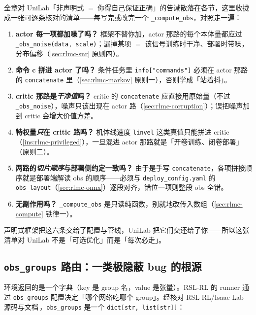 \begin{insight}\label{ins:rlmc-uniselfcheck}
全章对 UniLab「非声明式 $=$ 你得自己保证正确」的告诫散落在各节，这里收拢成一张可逐条核对的清单——每写完或改完一个 \verb|_compute_obs|，对照走一遍：
\begin{enumerate}
  \item \textbf{actor 每一项都加噪了吗？} 框架不替你加，actor 那路的每个本体量都应过 \verb|_obs_noise(data, scale)|；漏掉某项 $=$ 该信号训练时干净、部署时带噪，分布偏移（\cref{sec:rlmc-snr} 原则四）。
  \item \textbf{命令 $\mathbf c$ 拼进 actor 了吗？} 条件任务里 \verb|info["commands"]| 必须在 actor 那路的 \verb|concatenate| 里（\cref{sec:rlmc-markov} 原则一），否则学成「站着抖」。
  \item \textbf{critic 那路是\emph{干净值}吗？} critic 的 \verb|concatenate| 应直接用原始量（不过 \verb|_obs_noise|），噪声只该出现在 actor 路（\cref{sec:rlmc-corruption}）；误把噪声加到 critic 会增大价值方差。
  \item \textbf{特权量\emph{只}在 critic 路吗？} 机体线速度 \verb|linvel| 这类真值只能拼进 critic（\cref{ins:rlmc-privileged}），一旦混进 actor 那路就是「开卷训练、闭卷部署」（原则二）。
  \item \textbf{两路的\emph{切片顺序}与部署侧约定一致吗？} 由于是手写 \verb|concatenate|，各项拼接顺序就是部署端解读 obs 的顺序——必须与 \verb|deploy_config.yaml| 的 \verb|obs_layout|（\cref{sec:rlmc-onnx}）逐段对齐，错位一项则整段 obs 全错。
  \item \textbf{无副作用吗？} \verb|_compute_obs| 是只读纯函数，别就地改传入数组（\cref{sec:rlmc-compute} 铁律一）。
\end{enumerate}
声明式框架把这六条交给了配置与管线，UniLab 把它们交还给了你——所以这张清单对 UniLab 不是「可选优化」而是「每次必走」。
\end{insight}

\subsection{\texorpdfstring{\texttt{obs\_groups}}{obs\_groups} 路由：一类极隐蔽 bug 的根源}
\label{sec:rlmc-obsgroups}

环境返回的是一个字典（key 是 group 名，value 是张量）。RSL-RL 的 runner 通过 \verb|obs_groups| 配置决定「哪个网络吃哪个 group」。经核对 RSL-RL/Isaac Lab 源码与文档\,\cite{schwarke2025rslrl,isaaclab2024}，\verb|obs_groups| 是一个 \verb|dict[str, list[str]]|：

